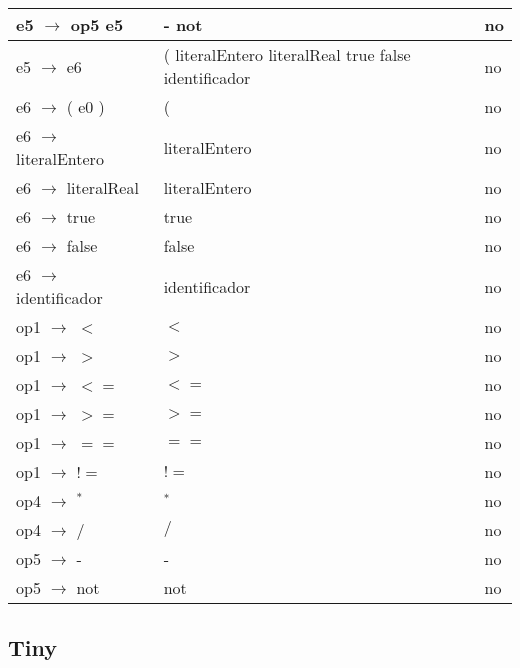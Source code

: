 \documentclass[11pt]{article}
\begin{document}
\begin{longtable}{|p{6cm}|p{4cm}|p{3cm}|}
                \hline
                e5 $\rightarrow$ op5 e5 & - not & no \\
                \hline
                e5 $\rightarrow$ e6 & ( literalEntero literalReal true false identificador & no \\
                \hline
                e6 $\rightarrow$ ( e0 ) & ( & no \\
                \hline
                e6 $\rightarrow$ literalEntero & literalEntero & no \\
                \hline
                e6 $\rightarrow$ literalReal & literalEntero & no \\
                \hline
                e6 $\rightarrow$ true & true & no \\
                \hline
                e6 $\rightarrow$ false & false & no \\
                \hline
                e6 $\rightarrow$ identificador & identificador & no \\
                \hline
                op1 $\rightarrow$ $<$ & $<$ & no \\
                \hline
                op1 $\rightarrow$ $>$ & $>$ & no \\
                \hline
                op1 $\rightarrow$ $<=$ & $<=$ & no \\
                \hline
                op1 $\rightarrow$ $>=$ & $>=$ & no \\
                \hline
                op1 $\rightarrow$ $==$ & $==$ & no \\
                \hline
                op1 $\rightarrow$ $!=$ & $!=$ & no \\
                \hline
                op4 $\rightarrow$ $^{\ast}$ & $^{\ast}$ & no \\
                \hline
                op4 $\rightarrow$ $/$ & $/$ & no \\
                \hline
                op5 $\rightarrow$ - & - & no \\
                \hline
                op5 $\rightarrow$ not & not & no \\
                \hline
            \end{longtable}
        \subsection{Tiny}
\end{document}
